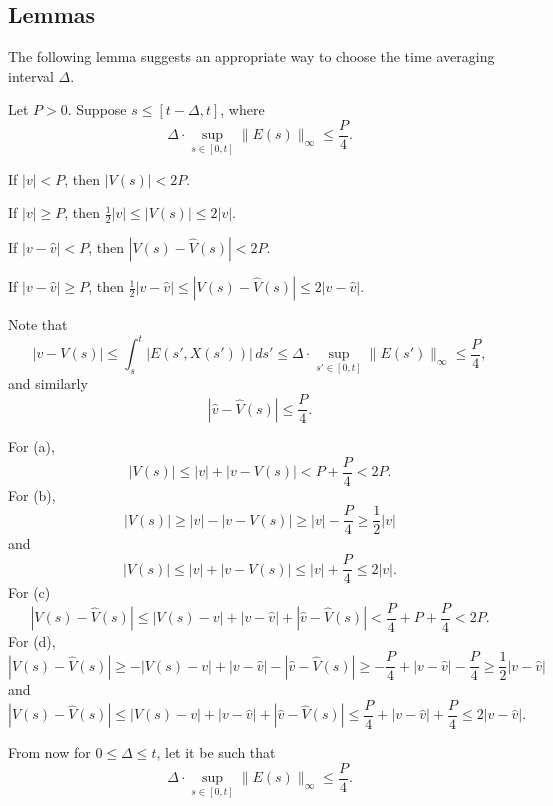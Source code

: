 \documentclass[12pt]{article}
\begin{document}
\subsection{Lemmas}
The following lemma suggests an appropriate way to choose the time averaging interval $\Delta$.
\begin{lem}
Let $P>0$.
Suppose $s\le[t-\Delta,t]$, where
\[\Delta\cdot\sup_{s\in[0,t]}\|E(s)\|_\infty\le\frac P4.\]
\begin{parts}
\item If $|v|<P$, then $|V(s)|<2P$.
\item If $|v|\ge P$, then $\frac12|v|\le|V(s)|\le2|v|$. 
\item If $|v-\hat v|<P$, then $|V(s)-\hat V(s)|<2P$.
\item If $|v-\hat v|\ge P$, then $\frac12|v-\hat v|\le|V(s)-\hat V(s)|\le2|v-\hat v|$.
\end{parts}
\end{lem}
\begin{pf}
Note that
\[|v-V(s)|\le\int_s^t|E(s',X(s'))|\,ds'\le\Delta\cdot\sup_{s'\in[0,t]}\|E(s')\|_\infty\le\frac P4,\]
and similarly
\[|\hat v-\hat V(s)|\le\frac P4.\]

For (a),
\[|V(s)|\le|v|+|v-V(s)|<P+\frac P4<2P.\]
For (b),
\[|V(s)|\ge|v|-|v-V(s)|\ge|v|-\frac P4\ge\frac12|v|\]
and
\[|V(s)|\le|v|+|v-V(s)|\le|v|+\frac P4\le2|v|.\]
For (c)
\[|V(s)-\hat V(s)|\le|V(s)-v|+|v-\hat v|+|\hat v-\hat V(s)|<\frac P4+P+\frac P4<2P.\]
For (d),
\[|V(s)-\hat V(s)|\ge-|V(s)-v|+|v-\hat v|-|\hat v-\hat V(s)|\ge-\frac P4+|v-\hat v|-\frac P4\ge\frac12|v-\hat v|\]
and
\[|V(s)-\hat V(s)|\le|V(s)-v|+|v-\hat v|+|\hat v-\hat V(s)|\le\frac P4+|v-\hat v|+\frac P4\le2|v-\hat v|.\]
\end{pf}


From now for $0\le\Delta\le t$, let it be such that
\[\Delta\cdot\sup_{s\in[0,t]}\|E(s)\|_\infty\le\frac P4.\]
\end{document}

